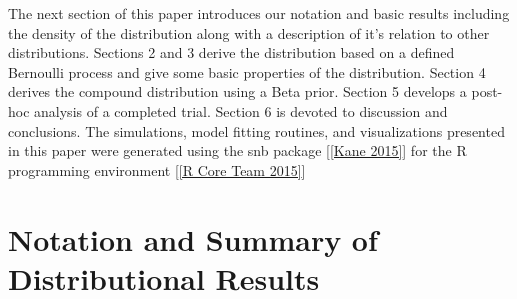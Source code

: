\documentclass[12pt]{article}         %
\begin{document}
The next section of this paper introduces our notation and basic results 
including the density of the distribution along with a description of 
it's relation to other distributions. Sections 2 and 3 derive the distribution 
based on a defined Bernoulli process and give some basic properties of the 
distribution. Section 4 derives the compound distribution using a Beta prior. 
Section 5 develops a post-hoc analysis of a completed trial. Section 6 is 
devoted to discussion and conclusions. The simulations, model fitting 
routines, and visualizations presented in this paper were generated using the 
snb package [\ref{Kane 2015}] for the R programming 
environment [\ref{R Core Team 2015}]



\section   {Notation and Summary of Distributional Results}
\label{notation.section}
\end{document}
